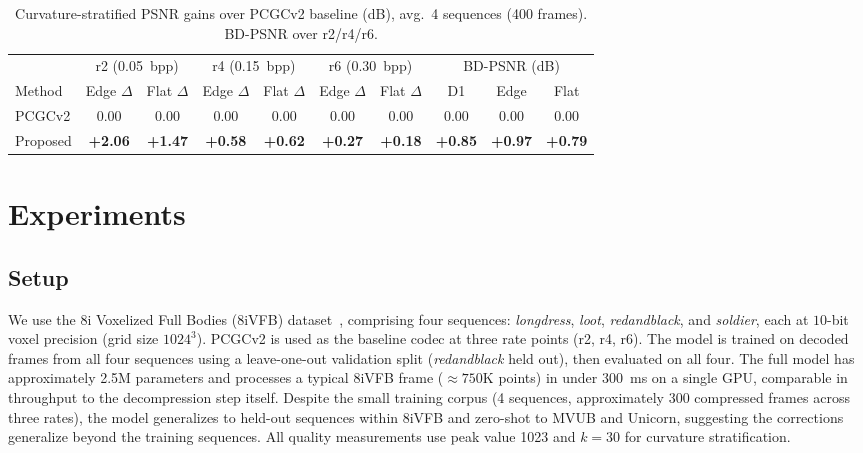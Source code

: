 \documentclass[conference]{IEEEtran}
\begin{document}
\begin{table}[!t]
  \centering
  \caption{Curvature-stratified PSNR gains over PCGCv2 baseline (dB), avg.\ 4 sequences (400 frames). BD-PSNR over r2/r4/r6.}
  \label{tab:main}
  \begin{tabular}{lccccccccc}
    \toprule
    & \multicolumn{2}{c}{r2 (0.05~bpp)} & \multicolumn{2}{c}{r4 (0.15~bpp)} & \multicolumn{2}{c}{r6 (0.30~bpp)} & \multicolumn{3}{c}{BD-PSNR (dB)} \\
    \cmidrule(lr){2-3} \cmidrule(lr){4-5} \cmidrule(lr){6-7} \cmidrule(lr){8-10}
    Method & Edge $\Delta$ & Flat $\Delta$ & Edge $\Delta$ & Flat $\Delta$ & Edge $\Delta$ & Flat $\Delta$ & D1 & Edge & Flat \\
    \midrule
    PCGCv2   & 0.00 & 0.00 & 0.00 & 0.00 & 0.00 & 0.00 & 0.00 & 0.00 & 0.00 \\
    Proposed & \textbf{+2.06} & \textbf{+1.47} & \textbf{+0.58} & \textbf{+0.62} & \textbf{+0.27} & \textbf{+0.18} & \textbf{+0.85} & \textbf{+0.97} & \textbf{+0.79} \\
    \bottomrule
  \end{tabular}
\end{table}

\section{Experiments}
\label{sec:experiments}

\subsection{Setup}

We use the 8i Voxelized Full Bodies (8iVFB) dataset~\cite{8ivfb}, comprising
four sequences: \emph{longdress}, \emph{loot}, \emph{redandblack}, and
\emph{soldier}, each at $10$-bit voxel precision (grid size $1024^3$).
PCGCv2 is used as the baseline codec at three rate points (r2, r4, r6).
The model is trained on decoded frames from all four sequences using a
leave-one-out validation split (\emph{redandblack} held out), then evaluated
on all four. The full model has approximately 2.5M parameters and processes a
typical 8iVFB frame (${\approx}750$K points) in under 300~ms on a single GPU,
comparable in throughput to the decompression step itself. Despite the small training corpus (4 sequences, approximately 300
compressed frames across three rates), the model generalizes to held-out
sequences within 8iVFB and zero-shot to MVUB and Unicorn, suggesting the
corrections generalize beyond the training sequences. All quality measurements use peak value 1023 and $k{=}30$
for curvature stratification.
\end{document}
